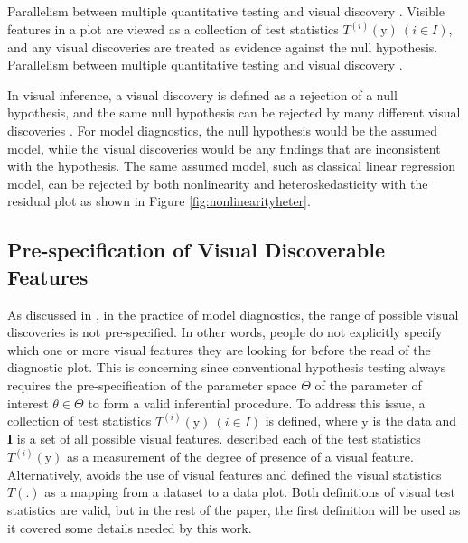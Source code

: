 \documentclass{monashthesis}
\theoremstyle{definition}
\theoremstyle{definition}
\theoremstyle{definition}
\theoremstyle{definition}
\theoremstyle{remark}
\begin{document}
Parallelism between multiple quantitative testing and visual discovery \autocite{buja_statistical_2009}. Visible features in a plot are viewed as a collection of test statistics \(T^{(i)}(\boldsymbol{\mathrm{y}})~(i \in I)\), and any visual discoveries are treated as evidence against the null hypothesis. Parallelism between multiple quantitative testing and visual discovery \autocite{buja_statistical_2009}.

In visual inference, a visual discovery is defined as a rejection of a null hypothesis, and the same null hypothesis can be rejected by many different visual discoveries \autocite{buja_statistical_2009}. For model diagnostics, the null hypothesis would be the assumed model, while the visual discoveries would be any findings that are inconsistent with the hypothesis. The same assumed model, such as classical linear regression model, can be rejected by both nonlinearity and heteroskedasticity with the residual plot as shown in Figure \ref{fig:nonlinearityheter}.

\hypertarget{pre-specification-of-visual-discoverable-features-1}{%
\subsection{Pre-specification of Visual Discoverable Features}\label{pre-specification-of-visual-discoverable-features-1}}

As discussed in \textcite{buja_statistical_2009}, in the practice of model diagnostics, the range of possible visual discoveries is not pre-specified. In other words, people do not explicitly specify which one or more visual features they are looking for before the read of the diagnostic plot. This is concerning since conventional hypothesis testing always requires the pre-specification of the parameter space \(\Theta\) of the parameter of interest \(\theta \in \Theta\) to form a valid inferential procedure. To address this issue, a collection of test statistics \(T^{(i)}(\boldsymbol{\mathrm{y}})~(i \in I)\) is defined, where \(\boldsymbol{\mathrm{y}}\) is the data and \(\boldsymbol{I}\) is a set of all possible visual features. \textcite{buja_statistical_2009} described each of the test statistics \(T^{(i)}(\boldsymbol{\mathrm{y}})\) as a measurement of the degree of presence of a visual feature. Alternatively, \textcite{majumder_validation_2013} avoids the use of visual features and defined the visual statistics \(T(.)\) as a mapping from a dataset to a data plot. Both definitions of visual test statistics are valid, but in the rest of the paper, the first definition will be used as it covered some details needed by this work.
\end{document}

